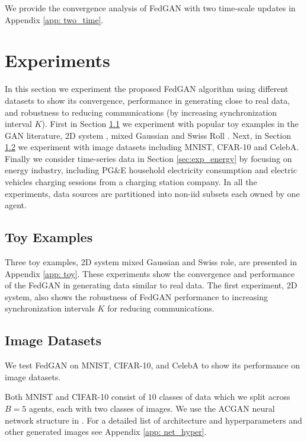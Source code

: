 \documentclass{article}
\begin{document}
We provide the convergence analysis of FedGAN with two time-scale updates in Appendix \ref{app: two_time}.
    


\section{Experiments}
In this section we experiment the proposed FedGAN algorithm using different datasets to show its convergence, performance in generating close to real data, and robustness to reducing communications (by increasing synchronization interval $K$). First in Section \ref{sec:toy} we experiment with popular toy examples in the GAN literature, 2D system \citep{nagarajan2017gradient}, mixed Gaussian \citep{Metz2016UnrolledGA} and Swiss Roll \citep{gulrajani2017improved}. Next, in Section \ref{sec:exp_img} we experiment with image datasets including MNIST, CFAR-10 and CelebA. Finally we consider time-series data in Section \ref{sec:exp_energy} by focusing on energy industry, including PG\&E household electricity consumption and electric vehicles charging sessions from a charging station company. In all the experiments, data sources are partitioned into non-iid subsets each owned by one agent.

	\subsection{Toy Examples}
	\label{sec:toy}
	
	Three toy examples, 2D system mixed Gaussian and Swiss role, are presented in  Appendix \ref{app: toy}. These experiments show the convergence and performance of the FedGAN in generating data similar to real data. The first experiment, 2D system, also shows the robustness of FedGAN performance to increasing synchronization intervals $K$ for reducing communications.
	
	 
	
	\subsection{Image Datasets}
	\label{sec:exp_img}
	We test  FedGAN on MNIST, CIFAR-10, and CelebA to show its performance on image datasets. 
	
	Both MNIST and CIFAR-10 consist of $10$ classes of data which we split across $B=5$ agents, each with two classes of  images. We use the ACGAN neural network structure in \citep{odena2017conditional}. For a detailed list of architecture and hyperparameters and other generated images see  Appendix \ref{app: net_hyper}.
	
\end{document}

